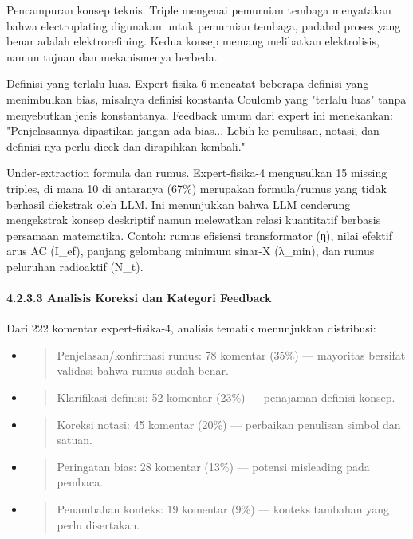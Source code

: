\documentclass[
]{article}
\begin{document}
Pencampuran konsep teknis. Triple mengenai pemurnian tembaga menyatakan
bahwa electroplating digunakan untuk pemurnian tembaga, padahal proses
yang benar adalah elektrorefining. Kedua konsep memang melibatkan
elektrolisis, namun tujuan dan mekanismenya berbeda.

Definisi yang terlalu luas. Expert-fisika-6 mencatat beberapa definisi
yang menimbulkan bias, misalnya definisi konstanta Coulomb yang "terlalu
luas" tanpa menyebutkan jenis konstantanya. Feedback umum dari expert
ini menekankan: "Penjelasannya dipastikan jangan ada bias... Lebih ke
penulisan, notasi, dan definisi nya perlu dicek dan dirapihkan kembali."

Under-extraction formula dan rumus. Expert-fisika-4 mengusulkan 15
missing triples, di mana 10 di antaranya (67\%) merupakan formula/rumus
yang tidak berhasil diekstrak oleh LLM. Ini menunjukkan bahwa LLM
cenderung mengekstrak konsep deskriptif namun melewatkan relasi
kuantitatif berbasis persamaan matematika. Contoh: rumus efisiensi
transformator (η), nilai efektif arus AC (I\_ef), panjang gelombang
minimum sinar-X (λ\_min), dan rumus peluruhan radioaktif (N\_t).

\hypertarget{analisis-koreksi-dan-kategori-feedback}{%
\paragraph{4.2.3.3 Analisis Koreksi dan Kategori
Feedback}\label{analisis-koreksi-dan-kategori-feedback}}

Dari 222 komentar expert-fisika-4, analisis tematik menunjukkan
distribusi:

\begin{itemize}
\item
  \begin{quote}
  Penjelasan/konfirmasi rumus: 78 komentar (35\%) --- mayoritas bersifat
  validasi bahwa rumus sudah benar.
  \end{quote}
\item
  \begin{quote}
  Klarifikasi definisi: 52 komentar (23\%) --- penajaman definisi
  konsep.
  \end{quote}
\item
  \begin{quote}
  Koreksi notasi: 45 komentar (20\%) --- perbaikan penulisan simbol dan
  satuan.
  \end{quote}
\item
  \begin{quote}
  Peringatan bias: 28 komentar (13\%) --- potensi misleading pada
  pembaca.
  \end{quote}
\item
  \begin{quote}
  Penambahan konteks: 19 komentar (9\%) --- konteks tambahan yang perlu
  disertakan.
  \end{quote}
\end{itemize}
\end{document}
